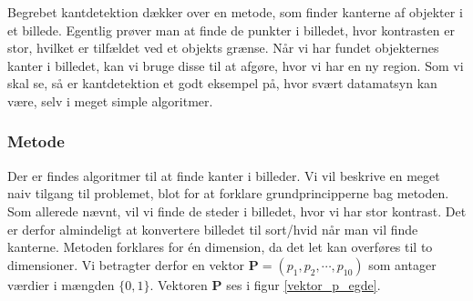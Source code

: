 {
Begrebet kantdetektion dækker over en metode, som finder kanterne af
objekter i et billede. Egentlig prøver man at finde de punkter i
billedet, hvor kontrasten er stor, hvilket er tilfældet ved et objekts
grænse. Når vi har fundet objekternes kanter i billedet, kan vi bruge
disse til at afgøre, hvor vi har en ny region.  Som vi skal se, så er
kantdetektion et godt eksempel på, hvor svært datamatsyn kan være, selv
i meget simple algoritmer.

\subsubsection*{Metode}
Der er findes algoritmer til at finde kanter i
billeder\cite{SIOlsen}. Vi vil beskrive en meget naiv tilgang til
problemet, blot for at forklare grundprincipperne bag metoden. Som
allerede nævnt, vil vi finde de steder i billedet, hvor vi har stor
kontrast. Det er derfor almindeligt at konvertere billedet til sort/hvid
når man vil finde kanterne. Metoden forklares for én dimension, da det
let kan overføres til to dimensioner. Vi betragter derfor en vektor
$\mathbf{P} = (p_1, p_2, \cdots, p_{10})$ som antager værdier i mængden
$\{0,1\}$. Vektoren $\mathbf{P}$ ses i figur \ref{vektor_p_egde}.

}
